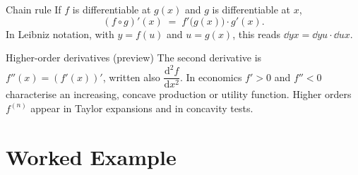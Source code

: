 \begin{rulebox}{Chain rule}
If $f$ is differentiable at $g(x)$ and $g$ is differentiable at $x$,
\[
  (f\circ g)'(x) \;=\; f'\bigl(g(x)\bigr)\cdot g'(x) .
\]
In Leibniz notation, with $y=f(u)$ and $u=g(x)$, this reads
$\dd{y}{x}=\dd{y}{u}\cdot\dd{u}{x}$.
\end{rulebox}

\begin{rulebox}{Higher-order derivatives (preview)}
The second derivative is $f''(x)=(f'(x))'$, written also
$\dfrac{\mathrm{d}^{2}f}{\mathrm{d}x^{2}}$. In economics $f'>0$ and $f''<0$
characterise an increasing, concave production or utility function. Higher
orders $f^{(n)}$ appear in Taylor expansions and in concavity tests.
\end{rulebox}

\section{Worked Example}


